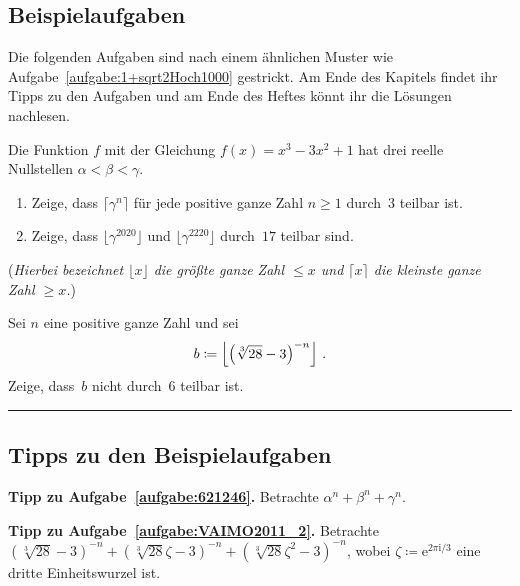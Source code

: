 \subsection*{Beispielaufgaben}

Die folgenden Aufgaben sind nach einem ähnlichen Muster wie Aufgabe~\ref{aufgabe:1+sqrt2Hoch1000} gestrickt. Am Ende des Kapitels findet ihr Tipps zu den Aufgaben und am Ende des Heftes könnt ihr die Lösungen nachlesen.

\begin{aufgabe*}\label{aufgabe:621246}
	Die Funktion $f$ mit der Gleichung $f(x)=x^3-3x^2+1$ hat drei reelle Nullstellen $\alpha<\beta<\gamma$.
	\begin{enumerate}[label={$(\alph*)$},ref={$(\alph*)$}]
		\item Zeige, dass $\lceil\gamma^n\rceil$ für jede positive ganze Zahl $n\geqslant 1$ durch~$3$ teilbar ist.\label{teilaufgabe:621246}
		\item Zeige, dass $\lfloor \gamma^{2020}\rfloor$ und $\lfloor \gamma^{2220}\rfloor$ durch~$17$ teilbar sind.\label{teilaufgabe:IMOSL1988}
	\end{enumerate}
	(\emph{Hierbei bezeichnet $\lfloor x\rfloor$ die größte ganze Zahl $\leqslant x$ und $\lceil x\rceil$ die kleinste ganze Zahl $\geqslant x$.}) 
\end{aufgabe*}
\begin{aufgabe*}\label{aufgabe:VAIMO2011_2}
	Sei $n$ eine positive ganze Zahl und sei
	\begin{equation*}
		b\coloneqq \left\lfloor \parens*{\sqrt[3]{28}-3}^{-n}\right\rfloor\,.
	\end{equation*}
	Zeige, dass~$b$ nicht durch~$6$ teilbar ist.
\end{aufgabe*}

\vfill\hrule\vspace{-1em}

\subsection*{Tipps zu den Beispielaufgaben}

\textbf{Tipp zu Aufgabe~\ref{aufgabe:621246}.} Betrachte $\alpha^n+\beta^n+\gamma^n$.

\textbf{Tipp zu Aufgabe~\ref{aufgabe:VAIMO2011_2}.} Betrachte $(\sqrt[3]{28}-3)^{-n}+(\sqrt[3]{28}\zeta-3)^{-n}+(\sqrt[3]{28}\zeta^2-3)^{-n}$, wobei $\zeta\coloneqq \mathrm{e}^{2\pi\mathrm{i}/3}$ eine dritte Einheitswurzel ist.
